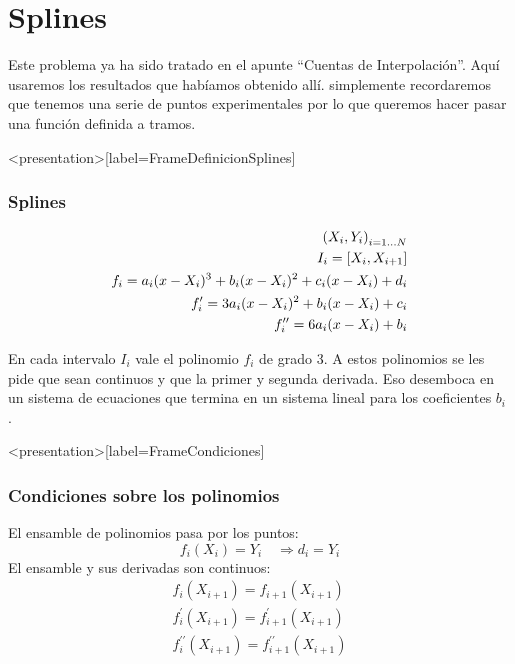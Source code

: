 \section{Splines}


Este problema ya ha sido tratado en el apunte ``Cuentas 
de Interpolación''. Aquí usaremos los resultados que habíamos obtenido allí.
simplemente recordaremos que tenemos una serie de puntos experimentales 
por lo que queremos hacer pasar una función definida a tramos. 

\mode*
\begin{frame}<presentation>[label=FrameDefinicionSplines]
  \frametitle{Splines}
  \begin{equation}
    \begin{split}
    { (X_i, Y_i) }_{i = 1 \dots N}\\
      I_i = \left[ X_i , X_{i+1} \right] \\
      f_i = a_i (x - X_i)^3 + b_i (x-X_i)^2 + c_i (x-X_i) + d_i\\
      \vspace{1cm}
      f ^{ \prime }_i = 3 a_i (x - X_i) ^2 + b_i (x - X_i) + c_i\\
      f^{\prime\prime} _i = 6 a_i (x - X_i)  + b_i
    \end{split}
  \end{equation}
\end{frame}

En cada intervalo $I_i$ vale el polinomio $f_i$ de grado 3. A estos polinomios
se les pide que sean continuos y que la primer y segunda derivada. Eso 
desemboca en un sistema de ecuaciones que termina en un sistema lineal para
los coeficientes $b_i$ . 

\mode*
\begin{frame}<presentation>[label=FrameCondiciones]
  \frametitle{Condiciones sobre los polinomios}
  El ensamble de polinomios pasa por los puntos:
    \begin{equation}
	f_i(X_i) =  Y_i \quad \Rightarrow d_i = Y_i 
    \end{equation}
  El ensamble y sus derivadas son continuos:
    \begin{equation}
      \begin{aligned}
	f_i(X_{i+1}) = f_{i+1}(X_{i+1}) \\
	f^{\prime}_i(X_{i+1}) = f^{\prime}_{i+1}(X_{i+1}) \\
	f^{\prime\prime}_i(X_{i+1}) = f^{\prime\prime}_{i+1}(X_{i+1}) 
      \end{aligned}
    \end{equation}
\end{frame}

